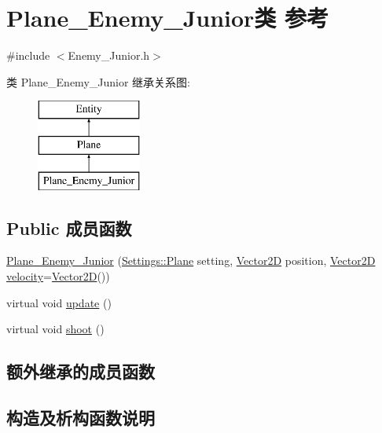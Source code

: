 \hypertarget{class_plane___enemy___junior}{}\section{Plane\+\_\+\+Enemy\+\_\+\+Junior类 参考}
\label{class_plane___enemy___junior}


{\ttfamily \#include $<$Enemy\+\_\+\+Junior.\+h$>$}

类 Plane\+\_\+\+Enemy\+\_\+\+Junior 继承关系图\+:\begin{figure}[H]
\begin{center}
\leavevmode
\includegraphics[height=3.000000cm]{class_plane___enemy___junior}
\end{center}
\end{figure}
\subsection*{Public 成员函数}
\begin{DoxyCompactItemize}
\item 
\hyperlink{class_plane___enemy___junior_a2a6b4a6903c05789e8be98d2d11a927d}{Plane\+\_\+\+Enemy\+\_\+\+Junior} (\hyperlink{struct_settings_1_1_plane}{Settings\+::\+Plane} setting, \hyperlink{_vector2_d_8hpp_aa1f1145650f1dd9bddf7335ec6434d7c}{Vector2D} position, \hyperlink{_vector2_d_8hpp_aa1f1145650f1dd9bddf7335ec6434d7c}{Vector2D} \hyperlink{class_entity_a386d25b56772b8913eb3e5adc636f6e0}{velocity}=\hyperlink{_vector2_d_8hpp_aa1f1145650f1dd9bddf7335ec6434d7c}{Vector2D}())
\item 
virtual void \hyperlink{class_plane___enemy___junior_a686e46c9927793dd07235cac72d52405}{update} ()
\item 
virtual void \hyperlink{class_plane___enemy___junior_ac9c3559aa4616f1b1efbe4a055fca0ac}{shoot} ()
\end{DoxyCompactItemize}
\subsection*{额外继承的成员函数}


\subsection{构造及析构函数说明}
\mbox{\label{class_plane___enemy___junior_a2a6b4a6903c05789e8be98d2d11a927d}} 
